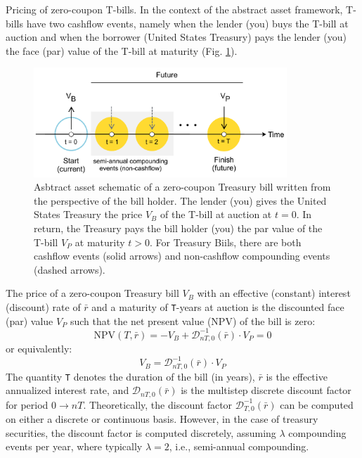 \documentclass[11pt]{article}
\makeatletter
\theoremstyle{definition}
\renewcommand\subsubsection{\@startsection
	{subsubsection}{2}{0mm}
	{-0.05in}
	{-0.5\baselineskip}
	{\normalfont\normalsize\itshape\bfseries}}
\makeatother
\begin{document}
\subsubsection{Pricing of zero-coupon T-bills.}
In the context of the abstract asset framework, T-bills have two cashflow events, namely when the lender (you) buys the T-bill at auction 
and when the borrower (United States Treasury) pays the lender (you) the face (par) value of the T-bill at maturity (Fig. \ref{fig:t-bill-schematic}).
\begin{figure}[h]
    \centering
    \includegraphics[width=0.85\textwidth]{./figs/Fig-Bill-Asset-Timeline-Schematic.pdf}
    \caption{Asbtract asset schematic of a zero-coupon Treasury bill written from the perspective of the bill holder. The lender (you) gives the United States Treasury 
    the price $V_{B}$ of the T-bill at auction at $ t = 0$. In return, the Treasury pays the bill holder (you) the par value of the T-bill $V_{P}$ at maturity $t>0$. 
	For Treasury Biils, there are both cashflow events (solid arrows) and non-cashflow compounding events (dashed arrows).}\label{fig:t-bill-schematic}
\end{figure}
The price of a zero-coupon Treasury bill $V_{B}$ with an effective (constant) interest (discount) rate of $\bar{r}$ and a maturity of \texttt{T}-years at auction 
is the discounted face (par) value $V_{P}$ such that the net present value (NPV) of the bill is zero:
\begin{equation}    
\text{NPV}(T,\bar{r}) = -V_{B} + \mathcal{D}_{nT,0}^{-1}(\bar{r})\cdot{V_{P}} = 0
\end{equation}
or equivalently:
\begin{equation}\label{eq:zero-coupon-treasury-bill-price}
    V_{B} = \mathcal{D}_{nT,0}^{-1}(\bar{r})\cdot{V_{P}}
\end{equation}
The quantity \texttt{T} denotes the duration of the bill (in years), 
$\bar{r}$ is the effective annualized interest rate,  and $\mathcal{D}_{nT,0}(\bar{r})$ is the multistep discrete discount factor
for period $0\rightarrow{nT}$. 
Theoretically, the discount factor $\mathcal{D}_{T,0}^{-1}(\bar{r})$ can be computed on either a discrete or continuous basis. 
However, in the case of treasury securities, the discount factor is computed discretely, assuming $\lambda$ compounding events per year, 
where typically $\lambda = 2$, i.e., semi-annual compounding.
\end{document}
